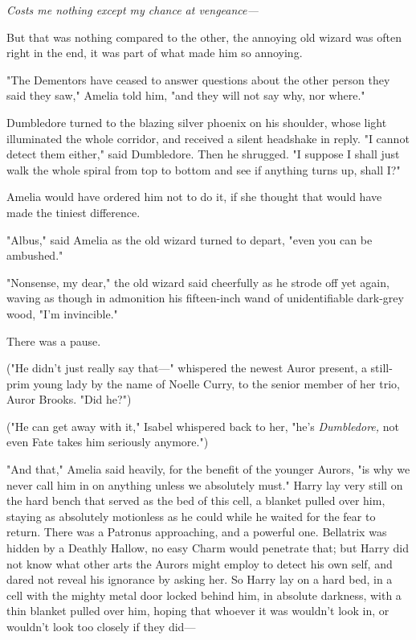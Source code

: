 \emph{Costs me nothing except my chance at vengeance---}

But that was nothing compared to the other, the annoying old wizard was often
right in the end, it was part of what made him so annoying.

"The Dementors have ceased to answer questions about the other person they said
they saw," Amelia told him, "and they will not say why, nor where."

Dumbledore turned to the blazing silver phoenix on his shoulder, whose light
illuminated the whole corridor, and received a silent headshake in reply. "I
cannot detect them either," said Dumbledore. Then he shrugged. "I suppose I
shall just walk the whole spiral from top to bottom and see if anything turns
up, shall I?"

Amelia would have ordered him not to do it, if she thought that would have made
the tiniest difference.

"Albus," said Amelia as the old wizard turned to depart, "even you can be
ambushed."

"Nonsense, my dear," the old wizard said cheerfully as he strode off yet again,
waving as though in admonition his fifteen-inch wand of unidentifiable
dark-grey wood, "I'm invincible."

There was a pause.

("He didn't just really say that\mbox{---}" whispered the newest Auror present, a
still-prim young lady by the name of Noelle Curry, to the senior member of her
trio, Auror Brooks. "Did he?")

("He can get away with it," Isabel whispered back to her, "he's
\emph{Dumbledore,} not even Fate takes him seriously anymore.")

"And that," Amelia said heavily, for the benefit of the younger Aurors, "is why
we never call him in on anything unless we absolutely must."
\sbreak
Harry lay very still on the hard bench that served as the bed of this cell, a
blanket pulled over him, staying as absolutely motionless as he could while he
waited for the fear to return. There was a Patronus approaching, and a powerful
one. Bellatrix was hidden by a Deathly Hallow, no easy Charm would penetrate
that; but Harry did not know what other arts the Aurors might employ to detect
his own self, and dared not reveal his ignorance by asking her. So Harry lay on
a hard bed, in a cell with the mighty metal door locked
behind him, in absolute darkness, with a thin blanket pulled over him, hoping
that whoever it was wouldn't look in, or wouldn't look too closely if they
did---

